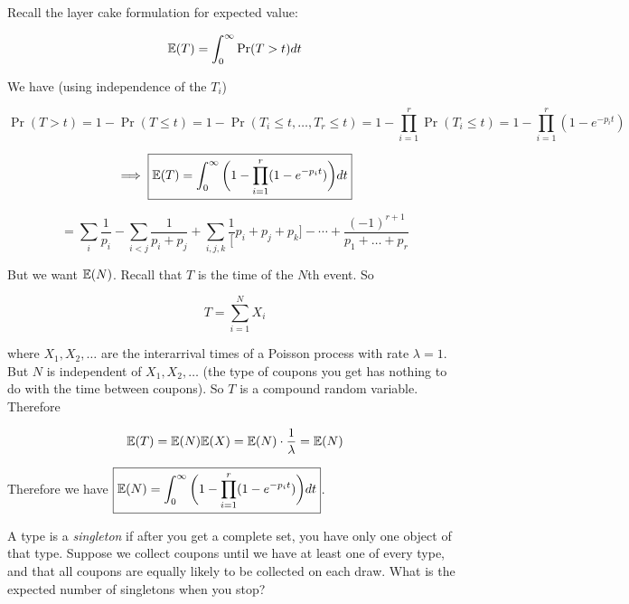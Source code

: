 \begin{solution} Recall the layer cake formulation for expected value:

\[
\mathbb{E}(T) = \int_0^\infty \Pr(T > t) dt 
\]

We have (using independence of the \(T_i\))

\[
\Pr(T > t) = 1 - \Pr(T \leq t) = 1 - \Pr(T_i \leq t, \ldots, T_r \leq t) = 1 - \prod_{i=1}^r \Pr(T_i \leq t) = 1 -  \prod_{i=1}^r  (1 - e^{-p_i t})
\]

\[
\implies \boxed{ \mathbb{E}(T) = \int_0^\infty \bigg( 1 - \prod_{i=1}^r (1 - e^{-p_i t}) \bigg) dt}
\]

\[
= \sum_i \frac{1}{p_i} - \sum_{i < j} \frac{1}{p_i + p_j} + \sum_{i , j , k} \frac{1}[p_i + p_j + p_k] - \cdots + \frac{(-1)^{r+1}}{p_1 + \ldots + p_r}
\]

But we want \(\mathbb{E}(N)\). Recall that \(T\) is the time of the \(N\)th event. So

\[
T= \sum_{i=1}^N X_i
\]

where \(X_1, X_2, \ldots\) are the interarrival times of a Poisson process with rate \(\lambda=1\). But \(N\) is independent of \(X_1, X_2, \ldots\) (the type of coupons you get has nothing to do with the time between coupons). So \(T\) is a compound random variable. Therefore

\[
\mathbb{E}(T) = \mathbb{E}(N) \mathbb{E}(X) = \mathbb{E}(N) \cdot \frac{1}{\lambda} = \mathbb{E}(N)
\]

Therefore we have \(\boxed{ \mathbb{E}(N) = \int_0^\infty \bigg( 1 - \prod_{i=1}^r (1 - e^{-p_i t}) \bigg) dt}\).

\end{solution}

\begin{example} A type is a \textit{singleton} if after you get a complete set, you have only one object of that type. Suppose we collect coupons until we have at least one of every type, and that all coupons are equally likely to be collected on each draw. What is the expected number of singletons when you stop?

\end{example}


